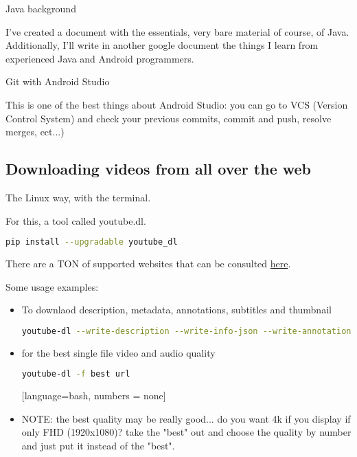 {\Large Java background}
\par I've created a document with the essentials, very bare material of course, of Java. Additionally, I'll write in another google document the things I learn from experienced Java and Android programmers.


{\Large Git with Android Studio}
\par This is one of the best things about Android Studio: you can go to VCS (Version Control System) and check your previous commits, commit and push, resolve merges, ect...)




\subsection{Downloading videos from all over the web}
\par The Linux way, with the terminal.
\par For this, a tool called youtube.dl.
    
\begin{lstlisting}[language=bash]
    pip install --upgradable youtube_dl
\end{lstlisting}

\par There are a TON of supported websites that can be consulted \href{https://ytdl-org.github.io/youtube-dl/supportedsites.html}{here}.

\par Some usage examples:
\begin{itemize}
    \item To downlaod description, metadata, annotations, subtitles and thumbnail
    \begin{lstlisting}[language=bash, numbers=none]
        youtube-dl --write-description --write-info-json --write-annotations --write-sub --write-thumbnail url
    \end{lstlisting}
    \item for the best single file video and audio quality
    \begin{lstlisting}[language=bash, numbers = none]
        youtube-dl -f best url
    \end{lstlisting}[language=bash, numbers = none]
    \item NOTE: the best quality may be really good... do you want 4k if you display if only FHD (1920x1080)? take the "best" out and choose the quality by number and just put it instead of the "best".
\end{itemize}


